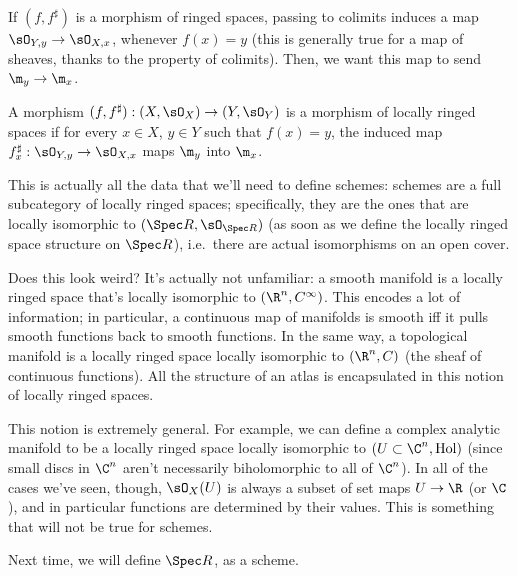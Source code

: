 If \((f,f^\sharp)\) is a morphism of ringed spaces, passing to colimits induces a map \(\sO_{Y,y}\to\sO_{X,x}\),
whenever \(f(x) = y\) (this is generally true for a map of sheaves, thanks to the property of colimits). Then, we
want this map to send \(\m_y\to\m_x\). 
\begin{defn}
A morphism \((f,f^\sharp):(X,\sO_X)\to(Y,\sO_Y)\) is a morphism of locally ringed spaces if for every \(x\in X\),
\(y\in Y\) such that \(f(x) = y\), the induced map \(f^\sharp_x: \sO_{Y,y}\to\sO_{X,x}\) maps \(\m_y\) into
\(\m_x\).
\end{defn}
This is actually all the data that we'll need to define schemes: schemes are a full subcategory of locally ringed
spaces; specifically, they are the ones that are locally isomorphic to \((\Spec R, \sO_{\Spec R})\) (as soon as we
define the locally ringed space structure on \(\Spec R\)), i.e.\ there are actual isomorphisms on an open cover.

Does this look weird? It's actually not unfamiliar: a smooth manifold is a locally ringed space that's locally
isomorphic to \((\R^n,C^\infty)\). This encodes a lot of information; in particular, a continuous map of manifolds
is smooth iff it pulls smooth functions back to smooth functions. In the same way, a topological manifold is a
locally ringed space locally isomorphic to \((\R^n,C)\) (the sheaf of continuous functions). All the structure of
an atlas is encapsulated in this notion of locally ringed spaces.

This notion is extremely general. For example, we can define a complex analytic manifold to be a locally ringed
space locally isomorphic to \((U\subset\C^n, \operatorname{Hol})\) (since small discs in \(\C^n\) aren't
necessarily biholomorphic to all of \(\C^n\)). In all of the cases we've seen, though, \(\sO_X(U)\) is always a
subset of set maps \(U\to\R\) (or \(\C\)), and in particular functions are determined by their values. This is
something that will not be true for schemes.

Next time, we will define \(\Spec R\), as a scheme.
